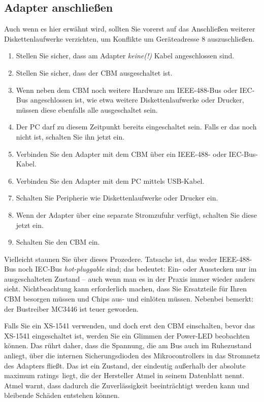 \documentclass[10pt,a4paper]{scrartcl}		%
\begin{document}
\subsection{Adapter anschließen}
Auch wenn es hier erwähnt wird, sollten Sie vorerst auf das Anschließen
weiterer Diskettenlaufwerke verzichten, um Konflikte um Geräteadresse 8
auszuschließen.
\begin{enumerate}
\item Stellen Sie sicher, dass am Adapter \textit{keine(!)} Kabel angeschlossen sind.
\item Stellen Sie sicher, dass der CBM ausgeschaltet ist.
\item Wenn neben dem CBM noch weitere Hardware am IEEE-488-Bus oder IEC-Bus
angeschlossen ist, wie etwa weitere Diskettenlaufwerke oder Drucker,
müssen diese ebenfalls alle ausgeschaltet sein.
\item Der PC darf zu diesem Zeitpunkt bereits eingeschaltet sein. Falls er das noch nicht ist, schalten Sie ihn jetzt ein.
\item Verbinden Sie den Adapter mit dem CBM über ein IEEE-488- oder IEC-Bus-Kabel.
\item Verbinden Sie den Adapter mit dem PC mittels USB-Kabel.
\item Schalten Sie Peripherie wie Diskettenlaufwerke oder Drucker ein.
\item Wenn der Adapter über eine separate Stromzufuhr verfügt, schalten Sie diese jetzt ein.
\item Schalten Sie den CBM ein.
\end{enumerate}

Vielleicht staunen Sie über dieses Prozedere. Tatsache ist, das weder
IEEE-488-Bus noch IEC-Bus \textit{hot-pluggable} sind; das bedeutet:
Ein- oder Ausstecken nur im ausgeschalteten Zustand -- auch wenn man es in
der Praxis immer wieder anders sieht. Nichtbeachtung kann erforderlich
machen, dass Sie Ersatzteile für Ihren CBM besorgen müssen und Chips
aus- und einlöten müssen. Nebenbei bemerkt: der Bustreiber MC3446 ist
teuer geworden.

Falls Sie ein XS-1541 verwenden, und doch erst den CBM einschalten, bevor
das XS-1541 eingeschaltet ist, werden Sie ein Glimmen der Power-LED
beobachten können. Das rührt daher, dass die Spannung, die am Bus auch im
Ruhezustand anliegt, über die internen Sicherungsdioden des Mikrocontrollers
in das Stromnetz des Adapters fließt. Das ist ein Zustand, der
eindeutig außerhalb der \glqq absolute maximum ratings\grqq\ liegt,
die der Hersteller Atmel in seinem Datenblatt nennt. Atmel warnt,
dass dadurch die Zuverlässigkeit beeinträchtigt werden kann und bleibende
Schäden entstehen können. 
\end{document}

